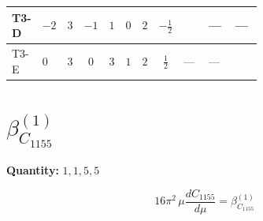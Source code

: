 \documentclass[8pt]{article}
\begin{document}
\begin{landscape}
\begin{longtable}{@{}llcccccc >{\raggedright\arraybackslash}p{0.21\linewidth} >{\raggedright\arraybackslash}p{0.21\linewidth} >{\raggedright\arraybackslash}p{0.21\linewidth}@{}}
\midrule
T3-D & $-2$ & $3$ & $-1$ & $1$ & $0$ & $2$ & $-\frac{1}{2}$ & \scriptsize\adjustbox{max width=\linewidth}{$\begin{gathered} - \frac{2 \sqrt{3} lambdaT_{3} \overline{y_{1}} \overline{y_{2}}}{3 MF}\end{gathered}$} & --- & --- \\
\midrule
T3-E & $0$ & $3$ & $0$ & $3$ & $1$ & $2$ & $\frac{1}{2}$ & --- & --- & \scriptsize\adjustbox{max width=\linewidth}{$\begin{gathered} \frac{2 \sqrt{6} lambdaT_{3} \overline{y_{1}} \overline{y_{2}}}{3 MF}\end{gathered}$} \\
\midrule
\bottomrule
\end{longtable}
\clearpage
\section*{$\beta_{C_{1155}}^{(1)}$}
\noindent\textbf{Quantity: }$\mathrm{1,1,5,5}$\par\smallskip
\[16\pi^2\,\mu\frac{d C_{1155}}{d\mu}=\beta_{C_{1155}}^{(1)}\]

\end{landscape}
\end{document}
